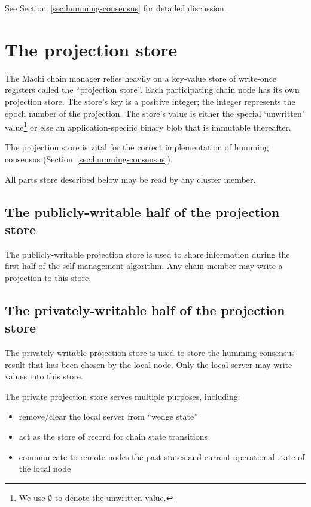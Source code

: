 \documentclass[preprint,10pt]{sigplanconf}
\begin{document}
See Section~\ref{sec:humming-consensus} for detailed discussion.

\section{The projection store}

The Machi chain manager relies heavily on a key-value store of
write-once registers called the ``projection store''.
Each participating chain node has its own projection store.
The store's key is a positive integer;
the integer represents the epoch number of the projection.  The
store's value is either the special `unwritten' value\footnote{We use
  $\emptyset$ to denote the unwritten value.} or else an
application-specific binary blob that is immutable thereafter.

The projection store is vital for the correct implementation of humming
consensus (Section~\ref{sec:humming-consensus}).

All parts store described below may be read by any cluster member.

\subsection{The publicly-writable half of the projection store}

The publicly-writable projection store is used to share information
during the first half of the self-management algorithm.  Any chain
member may write a projection to this store.

\subsection{The privately-writable half of the projection store}

The privately-writable projection store is used to store the humming consensus
result that has been chosen by the local node.  Only
the local server may write values into this store.

The private projection store serves multiple purposes, including:

\begin{itemize}
\item remove/clear the local server from ``wedge state''
\item act as the store of record for chain state transitions
\item communicate to remote nodes the past states and current operational
  state of the local node
\end{itemize}
\end{document}
